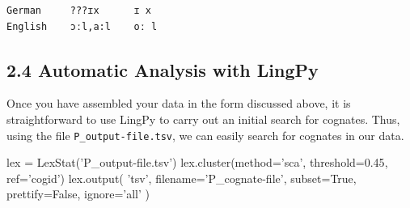 \documentclass[a4paper,svgnames]{scrartcl}
\newenvironment{Shaded}{}{}
\newcommand{\KeywordTok}[1]{\textcolor[rgb]{0.00,0.44,0.13}{\textbf{#1}}}
\newcommand{\FloatTok}[1]{\textcolor[rgb]{0.25,0.63,0.44}{#1}}
\newcommand{\SpecialCharTok}[1]{\textcolor[rgb]{0.25,0.44,0.63}{#1}}
\newcommand{\StringTok}[1]{\textcolor[rgb]{0.25,0.44,0.63}{#1}}
\newcommand{\VariableTok}[1]{\textcolor[rgb]{0.10,0.09,0.49}{#1}}
\newcommand{\ControlFlowTok}[1]{\textcolor[rgb]{0.00,0.44,0.13}{\textbf{#1}}}
\newcommand{\OperatorTok}[1]{\textcolor[rgb]{0.40,0.40,0.40}{#1}}
\newcommand{\BuiltInTok}[1]{#1}
\newcommand{\NormalTok}[1]{#1}
\begin{document}
\begin{Shaded}
\end{Shaded}

\begin{verbatim}
German     ???ɪx      ɪ x            
English    ɔːl,a:l    oː l           
\end{verbatim}

\subsection*{2.4 Automatic Analysis with
LingPy}\label{automatic-analysis-with-lingpy}

Once you have assembled your data in the form discussed above, it is
straightforward to use LingPy to carry out an initial search for
cognates. Thus, using the file \texttt{P\_output-file.tsv}, we can
easily search for cognates in our data.

\begin{Shaded}
\begin{Highlighting}[]
\NormalTok{lex }\OperatorTok{=}\NormalTok{ LexStat(}\StringTok{'P_output-file.tsv'}\NormalTok{)}
\NormalTok{lex.cluster(method}\OperatorTok{=}\StringTok{'sca'}\NormalTok{, threshold}\OperatorTok{=}\FloatTok{0.45}\NormalTok{, ref}\OperatorTok{=}\StringTok{'cogid'}\NormalTok{)}
\NormalTok{lex.output(}
    \StringTok{'tsv'}\NormalTok{, }
\NormalTok{    filename}\OperatorTok{=}\StringTok{'P_cognate-file'}\NormalTok{, }
\NormalTok{    subset}\OperatorTok{=}\VariableTok{True}\NormalTok{, }
\NormalTok{    prettify}\OperatorTok{=}\VariableTok{False}\NormalTok{, }
\NormalTok{    ignore}\OperatorTok{=}\StringTok{'all'}
\NormalTok{)}
\end{Highlighting}
\end{Shaded}
\end{document}
